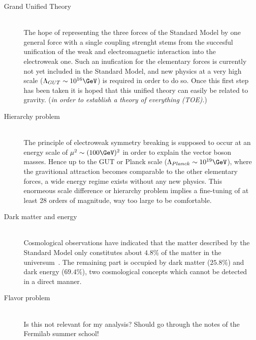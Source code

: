 \begin{myindentpar}
  \begin{description}
    \item[Grand Unified Theory] \hfill \\
    The hope of representing the three forces of the Standard Model by one general force with a single coupling strenght stems from the succesful unification of the weak and electromagnetic interaction into the electroweak one.
    Such an inufication for the elementary forces is currently not yet included in the Standard Model, and new physics at a very high scale ($\Lambda_{GUT} \sim 10^{16} \GeV$) is required in order to do so.
    Once this first step has been taken it is hoped that this unified theory can easily be related to gravity. (\textit{in order to establish a theory of everything (TOE).})
    
    \item[Hierarchy problem] \hfill \\
    The principle of electroweak symmetry breaking is supposed to occur at an energy scale of $\mu^{2} \sim (100 \GeV)^{2}$ in order to explain the vector boson masses. Hence up to the GUT or Planck scale ($\Lambda_{Planck} \sim 10^{19} \GeV$), where the gravitional attraction becomes comparable to the other elementary forces, a wide energy regime exists without any new physics. 
        This enormeous scale difference or hierarchy problem implies a fine-tuning of at least 28 orders of magnitude, way too large to be comfortable. 
    
    \item[Dark matter and energy] \hfill \\
    Cosmological observations have indicated that the matter described by the Standard Model only constitutes about $4.8 \%$ of the matter in the universum~\cite{PlanckResults}. The remaining part is occupied by dark matter ($25.8 \%$) and dark energy ($69.4 \%$), two cosmological concepts which cannot be detected in a direct manner.
    
    \item[Flavor problem] \hfill \\
    Is this not relevant for my analysis? Should go through the notes of the Fermilab summer school!
   \end{description}
\end{myindentpar}
